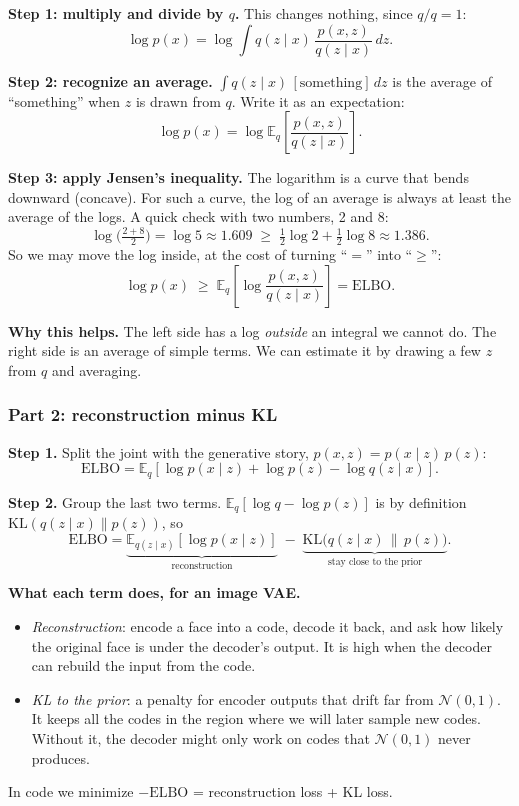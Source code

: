 \documentclass[12pt,a4paper]{article}
\begin{document}
\textbf{Step 1: multiply and divide by $q$.} This changes nothing, since $q/q = 1$:
\[
\log p(x) = \log \int q(z \mid x)\,\frac{p(x, z)}{q(z \mid x)}\, dz.
\]

\textbf{Step 2: recognize an average.} $\int q(z \mid x)\,[\text{something}]\,dz$ is the average of ``something'' when $z$ is drawn from $q$. Write it as an expectation:
\[
\log p(x) = \log \mathbb{E}_{q}\!\left[\frac{p(x, z)}{q(z \mid x)}\right].
\]

\textbf{Step 3: apply Jensen's inequality.} The logarithm is a curve that bends downward (concave). For such a curve, the log of an average is always at least the average of the logs. A quick check with two numbers, 2 and 8:
\[
\log\Big(\tfrac{2 + 8}{2}\Big) = \log 5 \approx 1.609 \;\ge\; \tfrac{1}{2}\log 2 + \tfrac{1}{2}\log 8 \approx 1.386.
\]
So we may move the log inside, at the cost of turning ``$=$'' into ``$\ge$'':
\[
\log p(x) \;\ge\; \mathbb{E}_{q}\!\left[\log \frac{p(x, z)}{q(z \mid x)}\right] = \text{ELBO}.
\]

\textbf{Why this helps.} The left side has a log \emph{outside} an integral we cannot do. The right side is an average of simple terms. We can estimate it by drawing a few $z$ from $q$ and averaging.

\subsubsection{Part 2: reconstruction minus KL}

\textbf{Step 1.} Split the joint with the generative story, $p(x, z) = p(x \mid z)\,p(z)$:
\[
\text{ELBO} = \mathbb{E}_q\!\left[\log p(x \mid z) + \log p(z) - \log q(z \mid x)\right].
\]

\textbf{Step 2.} Group the last two terms. $\mathbb{E}_q[\log q - \log p(z)]$ is by definition $\mathrm{KL}(q(z\mid x)\|p(z))$, so
\[
\text{ELBO} = \underbrace{\mathbb{E}_{q(z \mid x)}[\log p(x \mid z)]}_{\text{reconstruction}} \;-\; \underbrace{\mathrm{KL}\big(q(z \mid x)\,\|\,p(z)\big)}_{\text{stay close to the prior}}.
\]

\textbf{What each term does, for an image VAE.}
\begin{itemize}[leftmargin=*]
\item \emph{Reconstruction}: encode a face into a code, decode it back, and ask how likely the original face is under the decoder's output. It is high when the decoder can rebuild the input from the code.
\item \emph{KL to the prior}: a penalty for encoder outputs that drift far from $\mathcal{N}(0,1)$. It keeps all the codes in the region where we will later sample new codes. Without it, the decoder might only work on codes that $\mathcal{N}(0,1)$ never produces.
\end{itemize}
In code we minimize $-\text{ELBO}$ = reconstruction loss + KL loss.
\end{document}
